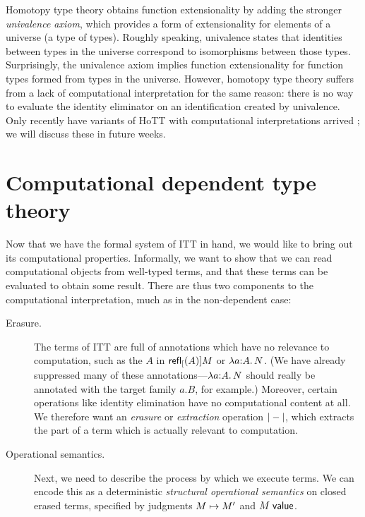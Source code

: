 \documentclass{article}
\begin{document}
Homotopy type theory \citep{HoTTBook:13} obtains function extensionality by
adding the stronger \emph{univalence axiom}, which provides a form of
extensionality for elements of a universe (a type of types). Roughly speaking,
univalence states that identities between types in the universe correspond to
isomorphisms between those types. Surprisingly, the univalence axiom implies
function extensionality for function types formed from types in the
universe. However, homotopy type theory suffers from a lack of computational
interpretation for the same reason: there is no way to evaluate the identity
eliminator on an identification created by univalence. Only recently have
variants of HoTT with computational interpretations arrived
\citep{Cohen:16,Angiuli:chtt3:17}; we will discuss these in future weeks.

\section{Computational dependent type theory}

Now that we have the formal system of ITT in hand, we would like to bring out
its computational properties. Informally, we want to show that we can read
computational objects from well-typed terms, and that these terms can be
evaluated to obtain some result. There are thus two components to the
computational interpretation, much as in the non-dependent case:

\begin{description}
\item[Erasure.] The terms of ITT are full of annotations which have no relevance
  to computation, such as the $A$ in $\mathsf{refl}_{[}(A)]{M}$ or $\lambda a {:} A.\, N$. (We have
  already suppressed many of these annotations---$\lambda a {:} A.\, N$ should really
  be annotated with the target family $a.B$, for example.) Moreover, certain
  operations like identity elimination have no computational content at all. We
  therefore want an \emph{erasure} or \emph{extraction} operation $|-|$,
  which extracts the part of a term which is actually relevant to computation.
\item[Operational semantics.] Next, we need to describe the process by which we
  execute terms. We can encode this as a deterministic \emph{structural
    operational semantics} on closed erased terms, specified by judgments
  $M \mapsto M'$ and $M\;\mathsf{value}$.
\end{description}
\end{document}
